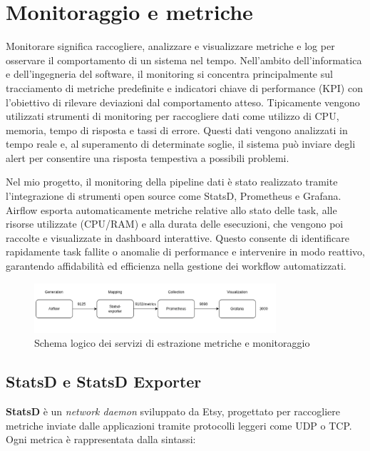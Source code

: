 \section{Monitoraggio e metriche}
\label{sec:monitoraggioemetriche}

Monitorare significa raccogliere, analizzare e visualizzare metriche e log per osservare il comportamento di un sistema nel tempo. Nell’ambito dell’informatica e dell’ingegneria del software, il monitoring si concentra principalmente sul tracciamento di metriche predefinite e indicatori chiave di performance (KPI) con l’obiettivo di rilevare deviazioni dal comportamento atteso.
Tipicamente vengono utilizzati strumenti di monitoring per raccogliere dati come utilizzo di CPU, memoria, tempo di risposta e tassi di errore. Questi dati vengono analizzati in tempo reale e, al superamento di determinate soglie, il sistema può inviare degli alert per consentire una risposta tempestiva a possibili problemi.

Nel mio progetto, il monitoring della pipeline dati è stato realizzato tramite l’integrazione di strumenti open source come StatsD, Prometheus e Grafana. Airflow esporta automaticamente metriche relative allo stato delle task, alle risorse utilizzate (CPU/RAM) e alla durata delle esecuzioni, che vengono poi raccolte e visualizzate in dashboard interattive. Questo consente di identificare rapidamente task fallite o anomalie di performance e intervenire in modo reattivo, garantendo affidabilità ed efficienza nella gestione dei workflow automatizzati.

\begin{figure}[h]
    \centering
    \includegraphics[width=0.8\textwidth]{img/monitoraggioschema.png}
    \caption{Schema logico dei servizi di estrazione metriche e monitoraggio}
    \label{fig:monitoring_schema}
\end{figure}

\subsection{StatsD e StatsD Exporter}
\label{sec:statsd}

\textbf{StatsD} è un \textit{network daemon} sviluppato da Etsy, progettato per raccogliere metriche inviate dalle applicazioni tramite protocolli leggeri come UDP o TCP. Ogni metrica è rappresentata dalla sintassi:

